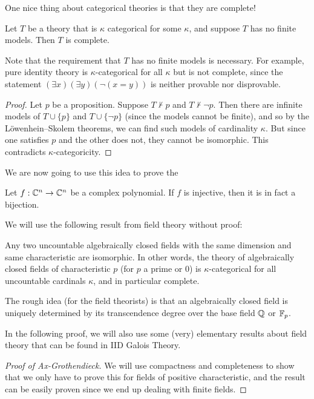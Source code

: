 \documentclass[a4paper]{article}
\begin{document}
\begin{own}
  One nice thing about categorical theories is that they are complete!
  \begin{prop}
    Let $T$ be a theory that is $\kappa$ categorical for some $\kappa$, and suppose $T$ has no finite models. Then $T$ is complete.
  \end{prop}
  Note that the requirement that $T$ has no finite models is necessary. For example, pure identity theory is $\kappa$-categorical for all $\kappa$ but is not complete, since the statement $(\exists x)(\exists y)(\neg (x = y))$ is neither provable nor disprovable.
  \begin{proof}
    Let $p$ be a proposition. Suppose $T \not\vdash p$ and $T \not\vdash \neg p$. Then there are infinite models of $T \cup \{p\}$ and $T \cup \{\neg p\}$ (since the models cannot be finite), and so by the L\"owenhein--Skolem theorems, we can find such models of cardinality $\kappa$. But since one satisfies $p$ and the other does not, they cannot be isomorphic. This contradicts $\kappa$-categoricity.
  \end{proof}

  We are now going to use this idea to prove the 
  \begin{thm}
    Let $f: \mathbb{C}^n \to \mathbb{C}^n$ be a complex polynomial. If $f$ is injective, then it is in fact a bijection.
  \end{thm}

  We will use the following result from field theory without proof:
  \begin{lemma}
    Any two uncountable algebraically closed fields with the same dimension and same characteristic are isomorphic. In other words, the theory of algebraically closed fields of characteristic $p$ (for $p$ a prime or $0$) is $\kappa$-categorical for all uncountable cardinals $\kappa$, and in particular complete.
  \end{lemma}
  The rough idea (for the field theorists) is that an algebraically closed field is uniquely determined by its transcendence degree over the base field $\mathbb{Q}$ or $\mathbb{F}_p$.

  In the following proof, we will also use some (very) elementary results about field theory that can be found in IID Galois Theory.

  \begin{proof}[Proof of Ax-Grothendieck]
    We will use compactness and completeness to show that we only have to prove this for fields of positive characteristic, and the result can be easily proven since we end up dealing with finite fields.


\end{proof}
\end{own}
\end{document}
